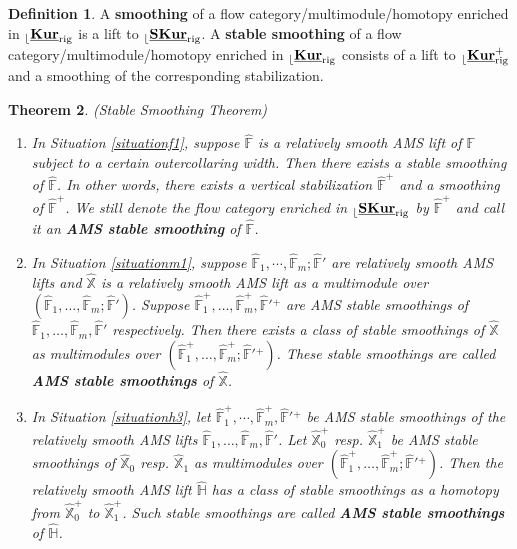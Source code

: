 \documentclass[reqno, 10pt]{amsart}
\numberwithin{equation}{section}
\numberwithin{equation}{section}
\newtheorem{thm}{Theorem}[section]
\theoremstyle{definition}
\newtheorem{defn}[thm]{Definition}
\theoremstyle{remark}
\newcommand{\mb}{\mathbb}
\renewcommand{\outer}{{}_{\lfloor}}
\newcommand{\uds}[1]{\underline{\smash{#1}}}
\begin{document}
\begin{defn}
A {\bf smoothing} of a flow category/multimodule/homotopy enriched in $\outer \uds{\bf Kur}_{\rm rig}$ is a lift to $\outer \uds{\bf SKur}_{\rm rig}$. A {\bf stable smoothing} of a flow category/multimodule/homotopy enriched in $\outer \uds{\bf Kur}_{\rm rig}$ consists of a lift to $\outer \uds{\bf Kur}_{\rm rig}^+$ and a smoothing of the corresponding stabilization.
\end{defn}


\begin{thm}(Stable Smoothing Theorem)
\begin{enumerate}

\item In Situation \ref{situationf1}, suppose $\hat{\mb F}$ is a relatively smooth AMS lift of ${\mb F}$ subject to a certain outercollaring width. Then there exists a stable smoothing of $\hat {\mb F}$. In other words, there exists a vertical stabilization $\hat{\mb F}^+$ and a  smoothing of $\hat {\mb F}^+$. We still denote the flow category enriched in $\outer \uds{\bf SKur}_{\rm rig}$ by $\hat {\mb F}^+$ and call it an {\bf AMS stable smoothing} of $\hat {\mb F}$.


\item In Situation \ref{situationm1}, suppose $\hat{\mb F}_1, \cdots, \hat {\mb F}_m; \hat {\mb F}'$ are relatively smooth AMS lifts and $\hat {\mb X}$ is a relatively smooth AMS lift as a multimodule over $(\hat{\mb F}_1, \ldots, \hat{\mb F}_m; \hat {\mb F}')$.  Suppose $\hat {\mb F}_1^+, \ldots, \hat {\mb F}_m^+, \hat {\mb F}'{}^+$ are AMS stable smoothings of $\hat {\mb F}_1, \ldots, \hat {\mb F}_m, \hat {\mb F}'$ respectively. Then there exists a class of stable smoothings of $\hat {\mb X}$ as multimodules over $(\hat {\mb F}_1^+, \ldots, \hat {\mb F}_m^+; \hat {\mb F}'{}^+)$. These stable smoothings are called {\bf AMS stable smoothings} of $\hat {\mb X}$. 

\item In Situation \ref{situationh3}, let $\hat {\mb F}_1^+, \cdots, \hat {\mb F}_m^+, \hat {\mb F}'{}^{+}$ be AMS stable smoothings of the relatively smooth AMS lifts $\hat {\mb F}_1, \ldots, \hat {\mb F}_m, \hat {\mb F}'$. Let $\hat {\mb X}_0^+$ resp. $\hat {\mb X}_1^+$ be AMS stable smoothings of $\hat {\mb X}_0$ resp. $\hat {\mb X}_1$ as multimodules over $(\hat {\mb F}_1^+, \ldots, \hat {\mb F}_m^+; \hat {\mb F}'{}^+)$. Then the relatively smooth AMS lift $\hat {\mb H}$ has a class of stable smoothings as a homotopy from $\hat {\mb X}_0^+$ to $\hat {\mb X}_1^+$. Such stable smoothings are called {\bf AMS stable smoothings} of $\hat {\mb H}$.
\end{enumerate}
\end{thm}
\end{document}
